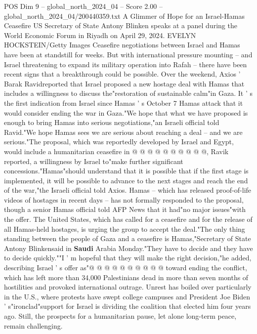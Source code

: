 \begin{textsample}{POS Dim 9 – global\_north\_2024\_04 – Score 2.00 – global\_north\_2024\_04/200440359.txt}  \label{ex:f9_pos_178}
A Glimmer of Hope for an Israel-Hamas Ceasefire US Secretary of State Antony Blinken speaks at a panel during the World Economic Forum in Riyadh on April 29, 2024.
EVELYN HOCKSTEIN/Getty Images Ceasefire negotiations between Israel and Hamas have been at standstill for weeks.
But with international pressure mounting -- and Israel threatening to expand its military operation into Rafah -- there have been recent signs that a breakthrough could be possible.
Over the weekend, Axios ' Barak Ravidreported that Israel proposed a new hostage deal with Hamas that includes a willingness to discuss the"restoration of sustainable calm"in Gaza.
It ' s the first indication from Israel since Hamas ' s October 7 Hamas attack that it would consider ending the war in Gaza."We hope that what we have proposed is enough to bring Hamas into serious negotiations,"an Israeli official told Ravid."We hope Hamas sees we are serious about reaching a deal -- and we are serious."The proposal, which was reportedly developed by Israel and Egypt, would include a humanitarian ceasefire in @ @ @ @ @ @ @ @ @ @, Ravik reported, a willingness by Israel to"make further significant concessions."Hamas"should understand that it is possible that if the first stage is implemented, it will be possible to advance to the next stages and reach the end of the war,"the Israeli official told Axios.
Hamas -- which has released proof-of-life videos of hostages in recent days -- has not formally responded to the proposal, though a senior Hamas official told AFP News that it had"no major issues"with the offer.
The United States, which has called for a ceasefire and for the release of all Hamas-held hostages, is urging the group to accept the deal."The only thing standing between the people of Gaza and a ceasefire is Hamas,"Secretary of State Antony Blinkensaid in \textbf{Saudi} Arabia Monday."They have to decide and they have to decide quickly.""I ' m hopeful that they will make the right decision,"he added, describing Israel ' s offer as"@ @ @ @ @ @ @ @ @ @ toward ending the conflict, which has left more than 34,000 Palestinians dead in more than seven months of hostilities and provoked international outrage.
Unrest has boiled over particularly in the U.S., where protests have swept college campuses and President Joe Biden ' s"ironclad"support for Israel is dividing the coalition that elected him four years ago.
Still, the prospects for a humanitarian pause, let alone long-term peace, remain challenging.

\end{textsample}
